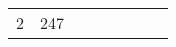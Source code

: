 \documentclass[12pt]{article}
\begin{document}
{\begin{tabular}{|c|c|c|c|c|c|c|c|}
        \multirow{2}{*}{2}  & \multirow{2}{*}{247}    &                                               & \multicolumn{1}{c}{}                                 & \multicolumn{1}{c}{}                           & \multicolumn{1}{c}{}                           & \multicolumn{1}{c}{}                           &                                               \\\cline{3-3}
                            &                         & \multicolumn{1}{c}{}                          & \multicolumn{1}{c}{}                                 & \multicolumn{1}{c}{}                           & \multicolumn{1}{c}{}                           & \multicolumn{1}{c}{}                           &                                               \\\hline
    \end{tabular}
}
\end{document}
